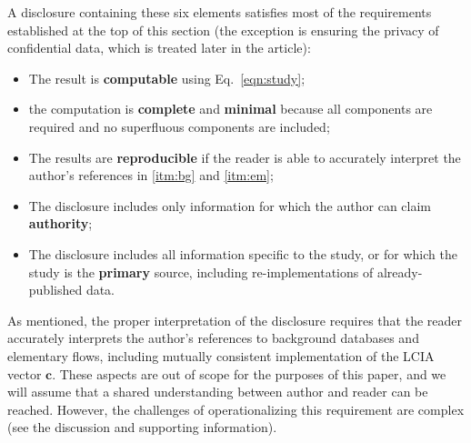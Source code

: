 A disclosure containing these six elements satisfies most of the requirements established at the top of this section (the exception is ensuring the privacy of confidential data, which is treated later in the article):
\begin{itemize}
  \item The result is \textbf{computable} using Eq.~\ref{eqn:study};
  \item the computation is \textbf{complete} and \textbf{minimal} because all components are required and no superfluous components are included;
  \item The results are \textbf{reproducible} if the reader is able to accurately interpret the author's references in \ref{itm:bg} and \ref{itm:em};
  \item The disclosure includes only information for which the author can claim \textbf{authority};
  \item The disclosure includes all information specific to the study, or for which the study is the \textbf{primary} source, including re-implementations of already-published data. 
\end{itemize}
As mentioned, the proper interpretation of the disclosure requires that the reader accurately interprets the author's references to background databases and elementary flows, including mutually consistent implementation of the LCIA vector $\mathbf{c}$.  These aspects are out of scope for the purposes of this paper, and we will assume that a shared understanding between author and reader can be reached.  However, the challenges of operationalizing this requirement are complex (see the discussion and supporting information).  %

